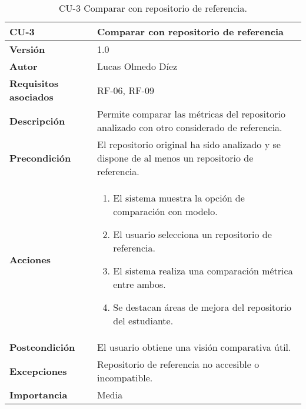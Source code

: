 \begin{table}[p]
	\centering
	\begin{tabularx}{\linewidth}{ p{} p{} }
		\toprule
		\textbf{CU-3}    & Comparar con repositorio de referencia \\
		\toprule
		\textbf{Versión}              & 1.0 \\
		\textbf{Autor}                & Lucas Olmedo Díez \\
		\textbf{Requisitos asociados} & RF-06, RF-09 \\
		\textbf{Descripción}          & Permite comparar las métricas del repositorio analizado con otro considerado de referencia. \\
		\textbf{Precondición}         & El repositorio original ha sido analizado y se dispone de al menos un repositorio de referencia. \\
		\textbf{Acciones}             &
		\begin{enumerate}
			\item El sistema muestra la opción de comparación con modelo.
			\item El usuario selecciona un repositorio de referencia.
			\item El sistema realiza una comparación métrica entre ambos.
			\item Se destacan áreas de mejora del repositorio del estudiante.
		\end{enumerate}\\
		\textbf{Postcondición}        & El usuario obtiene una visión comparativa útil. \\
		\textbf{Excepciones}          & Repositorio de referencia no accesible o incompatible. \\
		\textbf{Importancia}          & Media \\
		\bottomrule
	\end{tabularx}
	\caption{CU-3 Comparar con repositorio de referencia.}
\end{table}

